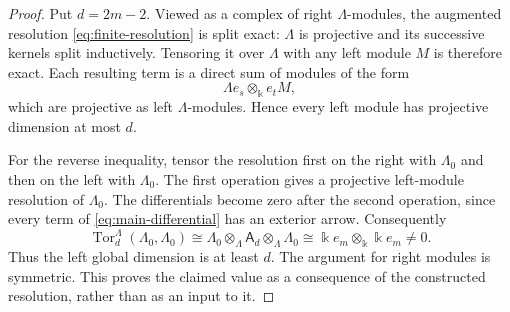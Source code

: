\documentclass[a4paper,11pt,oneside,reqno]{amsart}
\theoremstyle{definition}
\numberwithin{equation}{section}
\begin{document}
	\begin{proof}
		Put $d=2m-2$.  Viewed as a complex of right $\Lambda$-modules, the
		augmented resolution \eqref{eq:finite-resolution} is split exact:
		$\Lambda$ is projective and its successive kernels split inductively.
		Tensoring it over $\Lambda$ with any left module $M$ is therefore exact.
		Each resulting term is a direct sum of modules of the form
		\[
		\Lambda e_s\otimes_{\Bbbk} e_tM,
		\]
		which are projective as left $\Lambda$-modules.  Hence every left module
		has projective dimension at most $d$.
		
		For the reverse inequality, tensor the resolution first on the right
		with $\Lambda_0$ and then on the left with $\Lambda_0$.  The first operation gives a
		projective left-module resolution of $\Lambda_0$.  The differentials become
		zero after the second operation, since every term of
		\eqref{eq:main-differential} has an exterior arrow.  Consequently
		\[
		\operatorname{Tor}^{\Lambda}_d(\Lambda_0,\Lambda_0)
		\cong \Lambda_0\otimes_\Lambda \mathsf A_d\otimes_\Lambda \Lambda_0
		\cong \Bbbk e_m\otimes_{\Bbbk} \Bbbk e_m\ne0.
		\]
		Thus the left global dimension is at least $d$.  The argument for right
		modules is symmetric.  This proves the claimed value as a consequence
		of the constructed resolution, rather than as an input to it.
	\end{proof}
	
\end{document}
